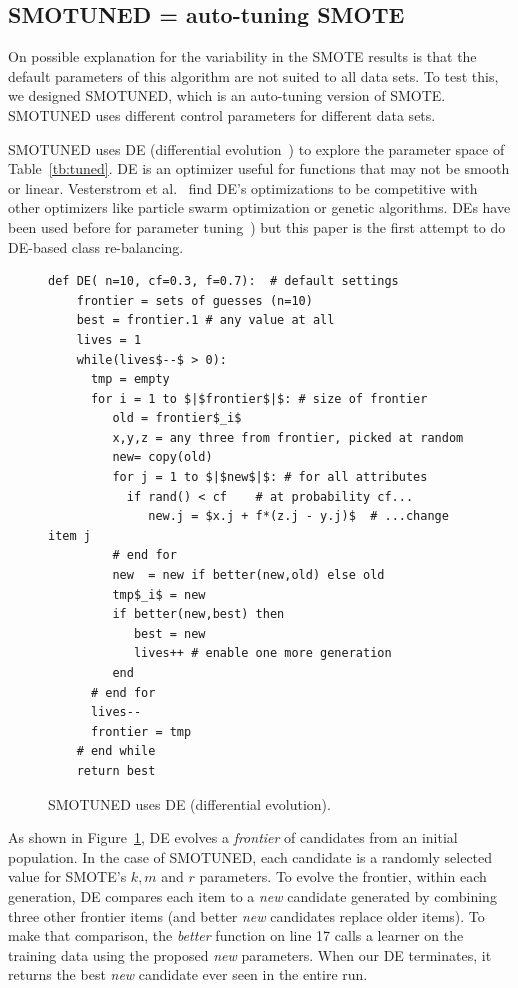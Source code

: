 \documentclass[10pt,conference]{IEEEtran}
\theoremstyle{break}
\theoremstyle{break}
\begin{document}
\subsection{SMOTUNED = auto-tuning SMOTE}
\label{sect:smotuned}

On possible explanation for the variability in the SMOTE results is that the
default parameters of this algorithm are not suited to all data sets. To test this,
we designed SMOTUNED, which is an auto-tuning version of SMOTE. SMOTUNED
uses different control parameters for different data sets.


 
SMOTUNED uses DE (differential evolution~\cite{storn1997differential}) to explore the parameter space of
Table~\ref{tb:tuned}.  DE is an
optimizer useful for functions that may not be smooth or linear.  Vesterstrom et al.~\cite{Vesterstrom04} find   DE's optimizations to be  competitive with other optimizers like 
   particle swarm optimization or genetic algorithms.
   DEs have been used before for   parameter tuning~\cite{omran2005differential, chiha2012tuning,fu2016tuning,fu2017easy, agrawal2016wrong}) but this paper is  the first attempt to do
   DE-based class re-balancing.

\begin{figure}[!b]
\scriptsize
\begin{lstlisting}[mathescape,linewidth=8.2cm,frame=r,numbers=right]
  def DE( n=10, cf=0.3, f=0.7):  # default settings
    frontier = sets of guesses (n=10)
    best = frontier.1 # any value at all
    lives = 1
    while(lives$--$ > 0): 
      tmp = empty
      for i = 1 to $|$frontier$|$: # size of frontier
         old = frontier$_i$
         x,y,z = any three from frontier, picked at random
         new= copy(old)  
         for j = 1 to $|$new$|$: # for all attributes
           if rand() < cf    # at probability cf...
              new.j = $x.j + f*(z.j - y.j)$  # ...change item j
         # end for
         new  = new if better(new,old) else old
         tmp$_i$ = new 
         if better(new,best) then
            best = new
            lives++ # enable one more generation
         end                  
      # end for
      lives--
      frontier = tmp
    # end while
    return best
\end{lstlisting}
\caption{SMOTUNED uses DE (differential evolution).}
\label{fig:pseudo_DE}  
\end{figure}


As shown in Figure~\ref{fig:pseudo_DE}, DE evolves a \textit{frontier} of
candidates from an initial population. In the case of SMOTUNED,
each  candidate is a randomly selected value for SMOTE's $k, m$ and $r$ parameters.
 To evolve the frontier, within each generation,
 DE compares each item to a {\em new} candidate generated
 by combining three other frontier items (and better {\em new} candidates replace
 older items). 
 To make that comparison, the {\em better} function on line 17 calls a learner on the training data using the proposed {\em new} parameters.
 When our DE  terminates, it returns the best {\em new} candidate ever seen in the entire run.
 
\end{document}
